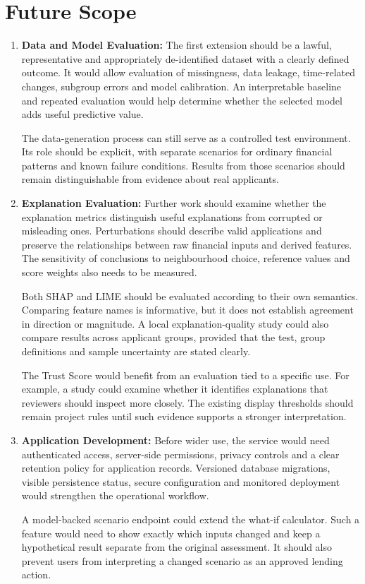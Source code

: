 \section{Future Scope}
\begin{enumerate}
\item \textbf{Data and Model Evaluation:}
The first extension should be a lawful, representative and appropriately de-identified dataset with a clearly defined outcome. It would allow evaluation of missingness, data leakage, time-related changes, subgroup errors and model calibration. An interpretable baseline and repeated evaluation would help determine whether the selected model adds useful predictive value.

The data-generation process can still serve as a controlled test environment. Its role should be explicit, with separate scenarios for ordinary financial patterns and known failure conditions. Results from those scenarios should remain distinguishable from evidence about real applicants.

\item \textbf{Explanation Evaluation:}
Further work should examine whether the explanation metrics distinguish useful explanations from corrupted or misleading ones. Perturbations should describe valid applications and preserve the relationships between raw financial inputs and derived features. The sensitivity of conclusions to neighbourhood choice, reference values and score weights also needs to be measured.

Both SHAP and LIME should be evaluated according to their own semantics. Comparing feature names is informative, but it does not establish agreement in direction or magnitude. A local explanation-quality study could also compare results across applicant groups, provided that the test, group definitions and sample uncertainty are stated clearly.

The Trust Score would benefit from an evaluation tied to a specific use. For example, a study could examine whether it identifies explanations that reviewers should inspect more closely. The existing display thresholds should remain project rules until such evidence supports a stronger interpretation.

\item \textbf{Application Development:}
Before wider use, the service would need authenticated access, server-side permissions, privacy controls and a clear retention policy for application records. Versioned database migrations, visible persistence status, secure configuration and monitored deployment would strengthen the operational workflow.

A model-backed scenario endpoint could extend the what-if calculator. Such a feature would need to show exactly which inputs changed and keep a hypothetical result separate from the original assessment. It should also prevent users from interpreting a changed scenario as an approved lending action.

\end{enumerate}


